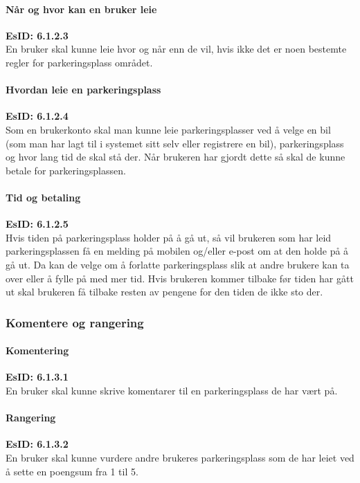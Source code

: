 \documentclass[12pt]{article}
\newcommand{\EsID}[1]{\textbf{EsID: #1}\\}
\begin{document}
            \paragraph{Når og hvor kan en bruker leie}
            \EsID{6.1.2.3}
            En bruker skal kunne leie hvor og når enn de vil, hvis ikke det er noen bestemte regler for parkeringsplass området.

            \paragraph{Hvordan leie en parkeringsplass}
            \EsID{6.1.2.4}
            Som en brukerkonto skal man kunne leie parkeringsplasser ved å velge en bil (som man har lagt til i systemet sitt selv eller registrere en bil), parkeringsplass og hvor lang tid de skal stå der. Når brukeren har gjordt dette så skal de kunne betale for parkeringsplassen.

            \paragraph{Tid og betaling}
            \EsID{6.1.2.5}
            Hvis tiden på parkeringsplass holder på å gå ut, så vil brukeren som har leid parkeringsplassen få en melding på mobilen og/eller e-post om at den holde på å gå ut. Da kan de velge om å forlatte parkeringsplass slik at andre brukere kan ta over eller å fylle på med mer tid. Hvis brukeren kommer tilbake før tiden har gått ut skal brukeren få tilbake resten av pengene for den tiden de ikke sto der.

        \subsubsection{Komentere og rangering}

            \paragraph{Komentering}
            \EsID{6.1.3.1}
            En bruker skal kunne skrive komentarer til en parkeringsplass de har vært på. 

            \paragraph{Rangering}
            \EsID{6.1.3.2}
            En bruker skal kunne vurdere andre brukeres parkeringsplass som de har leiet ved å sette en poengsum fra 1 til 5.
\end{document}
